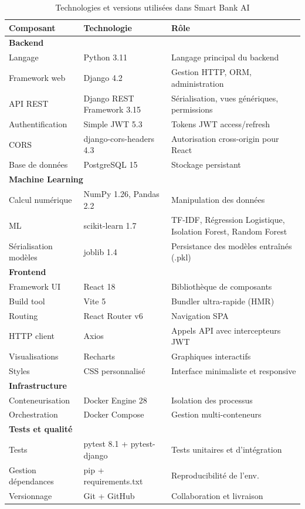 \documentclass[12pt,a4paper]{report}
\begin{document}
\begin{table}[H]
  \centering
  \caption{Technologies et versions utilisées dans Smart Bank AI}
  \label{tab:technologies}
  \renewcommand{\arraystretch}{1.3}
  \begin{tabularx}{\textwidth}{llX}
    \toprule
    Composant & Technologie & Rôle \\
    \midrule
    \multicolumn{3}{l}{\textbf{Backend}} \\
    Langage & Python 3.11 & Langage principal du backend \\
    Framework web & Django 4.2 & Gestion HTTP, ORM, administration \\
    API REST & Django REST Framework 3.15 & Sérialisation, vues génériques, permissions \\
    Authentification & Simple JWT 5.3 & Tokens JWT access/refresh \\
    CORS & django-cors-headers 4.3 & Autorisation cross-origin pour React \\
    Base de données & PostgreSQL 15 & Stockage persistant \\
    \midrule
    \multicolumn{3}{l}{\textbf{Machine Learning}} \\
    Calcul numérique & NumPy 1.26, Pandas 2.2 & Manipulation des données \\
    ML & scikit-learn 1.7 & TF-IDF, Régression Logistique, Isolation Forest, Random Forest \\
    Sérialisation modèles & joblib 1.4 & Persistance des modèles entraînés (.pkl) \\
    \midrule
    \multicolumn{3}{l}{\textbf{Frontend}} \\
    Framework UI & React 18 & Bibliothèque de composants \\
    Build tool & Vite 5 & Bundler ultra-rapide (HMR) \\
    Routing & React Router v6 & Navigation SPA \\
    HTTP client & Axios & Appels API avec intercepteurs JWT \\
    Visualisations & Recharts & Graphiques interactifs \\
    Styles & CSS personnalisé & Interface minimaliste et responsive \\
    \midrule
    \multicolumn{3}{l}{\textbf{Infrastructure}} \\
    Conteneurisation & Docker Engine 28 & Isolation des processus \\
    Orchestration & Docker Compose & Gestion multi-conteneurs \\
    \midrule
    \multicolumn{3}{l}{\textbf{Tests et qualité}} \\
    Tests & pytest 8.1 + pytest-django & Tests unitaires et d'intégration \\
    Gestion dépendances & pip + requirements.txt & Reproducibilité de l'env. \\
    Versionnage & Git + GitHub & Collaboration et livraison \\
    \bottomrule
  \end{tabularx}
\end{table}
\end{document}
